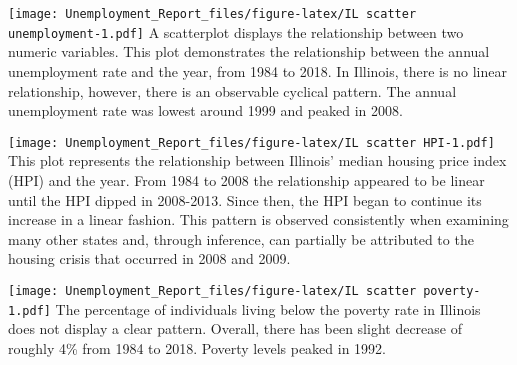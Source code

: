 \documentclass[
]{article}
\newenvironment{Shaded}{\begin{snugshade}}{\end{snugshade}}
\newcommand{\DataTypeTok}[1]{\textcolor[rgb]{0.13,0.29,0.53}{#1}}
\newcommand{\DecValTok}[1]{\textcolor[rgb]{0.00,0.00,0.81}{#1}}
\newcommand{\KeywordTok}[1]{\textcolor[rgb]{0.13,0.29,0.53}{\textbf{#1}}}
\newcommand{\NormalTok}[1]{#1}
\newcommand{\OperatorTok}[1]{\textcolor[rgb]{0.81,0.36,0.00}{\textbf{#1}}}
\newcommand{\StringTok}[1]{\textcolor[rgb]{0.31,0.60,0.02}{#1}}
\begin{document}
\texttt{[image: Unemployment\_Report\_files/figure-latex/IL scatter unemployment-1.pdf]}
A scatterplot displays the relationship between two numeric variables.
This plot demonstrates the relationship between the annual unemployment
rate and the year, from 1984 to 2018. In Illinois, there is no linear
relationship, however, there is an observable cyclical pattern. The
annual unemployment rate was lowest around 1999 and peaked in 2008.

\begin{Shaded}
\end{Shaded}

\texttt{[image: Unemployment\_Report\_files/figure-latex/IL scatter HPI-1.pdf]}
This plot represents the relationship between Illinois' median housing
price index (HPI) and the year. From 1984 to 2008 the relationship
appeared to be linear until the HPI dipped in 2008-2013. Since then, the
HPI began to continue its increase in a linear fashion. This pattern is
observed consistently when examining many other states and, through
inference, can partially be attributed to the housing crisis that
occurred in 2008 and 2009.

\begin{Shaded}
\end{Shaded}

\texttt{[image: Unemployment\_Report\_files/figure-latex/IL scatter poverty-1.pdf]}
The percentage of individuals living below the poverty rate in Illinois
does not display a clear pattern. Overall, there has been slight
decrease of roughly 4\% from 1984 to 2018. Poverty levels peaked in
1992.
\end{document}

